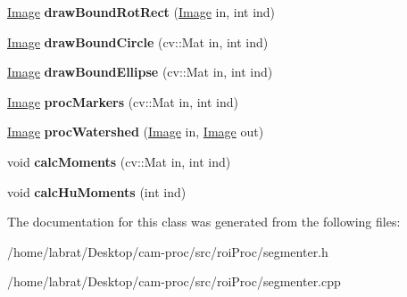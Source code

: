 \begin{DoxyCompactItemize}
\item 
\hyperlink{classImage}{Image} {\bfseries draw\+Bound\+Rot\+Rect} (\hyperlink{classImage}{Image} in, int ind)\hypertarget{classSegmenter_ae60f351ae7fd0d33ef61756770d29c3a}{}\label{classSegmenter_ae60f351ae7fd0d33ef61756770d29c3a}

\item 
\hyperlink{classImage}{Image} {\bfseries draw\+Bound\+Circle} (cv\+::\+Mat in, int ind)\hypertarget{classSegmenter_ae373ac05c991729d9b0a958fd411387d}{}\label{classSegmenter_ae373ac05c991729d9b0a958fd411387d}

\item 
\hyperlink{classImage}{Image} {\bfseries draw\+Bound\+Ellipse} (cv\+::\+Mat in, int ind)\hypertarget{classSegmenter_aa1b3b5963af2bf4e7a7755e15b4a467f}{}\label{classSegmenter_aa1b3b5963af2bf4e7a7755e15b4a467f}

\item 
\hyperlink{classImage}{Image} {\bfseries proc\+Markers} (cv\+::\+Mat in, int ind)\hypertarget{classSegmenter_a505367c5d793177ae076589f40435c25}{}\label{classSegmenter_a505367c5d793177ae076589f40435c25}

\item 
\hyperlink{classImage}{Image} {\bfseries proc\+Watershed} (\hyperlink{classImage}{Image} in, \hyperlink{classImage}{Image} out)\hypertarget{classSegmenter_a4f93fa4e012971d81f0d04f56bd06325}{}\label{classSegmenter_a4f93fa4e012971d81f0d04f56bd06325}

\item 
void {\bfseries calc\+Moments} (cv\+::\+Mat in, int ind)\hypertarget{classSegmenter_a271f104d841fd42f8f961d2a43fc573d}{}\label{classSegmenter_a271f104d841fd42f8f961d2a43fc573d}

\item 
void {\bfseries calc\+Hu\+Moments} (int ind)\hypertarget{classSegmenter_ad4ca3cf833fc9612a5df389d607a8cd3}{}\label{classSegmenter_ad4ca3cf833fc9612a5df389d607a8cd3}

\end{DoxyCompactItemize}


The documentation for this class was generated from the following files\+:\begin{DoxyCompactItemize}
\item 
/home/labrat/\+Desktop/cam-\/proc/src/roi\+Proc/segmenter.\+h\item 
/home/labrat/\+Desktop/cam-\/proc/src/roi\+Proc/segmenter.\+cpp\end{DoxyCompactItemize}
